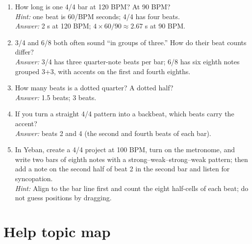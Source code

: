 \begin{exercise}
\begin{enumerate}
  \item How long is one 4/4 bar at 120 BPM? At 90 BPM?\\
  \emph{Hint:} one beat is 60/BPM seconds; 4/4 has four beats.\\
  \emph{Answer:} 2 s at 120 BPM; \(4 \times 60/90 \approx 2.67\) s at 90 BPM.
  \item 3/4 and 6/8 both often sound ``in groups of three.'' How do their beat counts differ?\\
  \emph{Answer:} 3/4 has three quarter-note beats per bar; 6/8 has six eighth notes grouped 3+3, with accents on the first and fourth eighths.
  \item How many beats is a dotted quarter? A dotted half?\\
  \emph{Answer:} 1.5 beats; 3 beats.
  \item If you turn a straight 4/4 pattern into a backbeat, which beats carry the accent?\\
  \emph{Answer:} beats 2 and 4 (the second and fourth beats of each bar).
  \item In Yeban, create a 4/4 project at 100 BPM, turn on the metronome, and write two bars of eighth notes with a strong--weak--strong--weak pattern; then add a note on the second half of beat 2 in the second bar and listen for syncopation.\\
  \emph{Hint:} Align to the bar line first and count the eight half-cells of each beat; do not guess positions by dragging.
\end{enumerate}
\end{exercise}

\section{Help topic map}

